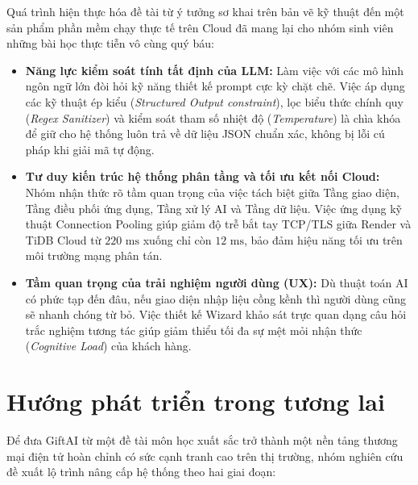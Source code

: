 Quá trình hiện thực hóa đề tài từ ý tưởng sơ khai trên bản vẽ kỹ thuật đến một sản phẩm phần mềm chạy thực tế trên Cloud đã mang lại cho nhóm sinh viên những bài học thực tiễn vô cùng quý báu:
\begin{itemize}
    \item \textbf{Năng lực kiểm soát tính tất định của LLM:} Làm việc với các mô hình ngôn ngữ lớn đòi hỏi kỹ năng thiết kế prompt cực kỳ chặt chẽ. Việc áp dụng các kỹ thuật ép kiểu (\textit{Structured Output constraint}), lọc biểu thức chính quy (\textit{Regex Sanitizer}) và kiểm soát tham số nhiệt độ (\textit{Temperature}) là chìa khóa để giữ cho hệ thống luôn trả về dữ liệu JSON chuẩn xác, không bị lỗi cú pháp khi giải mã tự động.
    \item \textbf{Tư duy kiến trúc hệ thống phân tầng và tối ưu kết nối Cloud:} Nhóm nhận thức rõ tầm quan trọng của việc tách biệt giữa Tầng giao diện, Tầng điều phối ứng dụng, Tầng xử lý AI và Tầng dữ liệu. Việc ứng dụng kỹ thuật Connection Pooling giúp giảm độ trễ bắt tay TCP/TLS giữa Render và TiDB Cloud từ $220\text{ ms}$ xuống chỉ còn $12\text{ ms}$, bảo đảm hiệu năng tối ưu trên môi trường mạng phân tán.
    \item \textbf{Tầm quan trọng của trải nghiệm người dùng (UX):} Dù thuật toán AI có phức tạp đến đâu, nếu giao diện nhập liệu cồng kềnh thì người dùng cũng sẽ nhanh chóng từ bỏ. Việc thiết kế Wizard khảo sát trực quan dạng câu hỏi trắc nghiệm tương tác giúp giảm thiểu tối đa sự mệt mỏi nhận thức (\textit{Cognitive Load}) của khách hàng.
\end{itemize}

\section{Hướng phát triển trong tương lai}

Để đưa GiftAI từ một đề tài môn học xuất sắc trở thành một nền tảng thương mại điện tử hoàn chỉnh có sức cạnh tranh cao trên thị trường, nhóm nghiên cứu đề xuất lộ trình nâng cấp hệ thống theo hai giai đoạn:

